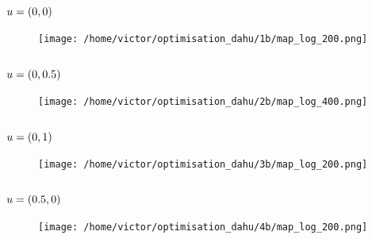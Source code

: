 \documentclass[../../Main_ManuscritThese.tex]{subfiles}
\begin{document}
\subsection*{$u=(0, 0)$}
\begin{figure}[ht]
  \centering
  \texttt{[image: /home/victor/optimisation\_dahu/1b/map\_log\_200.png]}
\end{figure}
\begin{figure}[ht]
  \centering
  \resizebox{1\textwidth}{!}{}
\end{figure}
\clearpage

\subsection*{$u=(0, 0.5)$}
\begin{figure}[ht]
  \centering
  \texttt{[image: /home/victor/optimisation\_dahu/2b/map\_log\_400.png]}
\end{figure}
\begin{figure}[ht]
  \centering
    \resizebox{1\textwidth}{!}{}
\end{figure}
\clearpage
\subsection*{$u=(0, 1)$}
\begin{figure}[ht]
  \centering
  \texttt{[image: /home/victor/optimisation\_dahu/3b/map\_log\_200.png]}
\end{figure}
\begin{figure}[ht]
  \centering
  \resizebox{1\textwidth}{!}{}
\end{figure}
\clearpage
\subsection*{$u=(0.5, 0)$}
\begin{figure}[ht]
  \centering
  \texttt{[image: /home/victor/optimisation\_dahu/4b/map\_log\_200.png]}
\end{figure}
\begin{figure}[ht]
  \centering
  \resizebox{1\textwidth}{!}{}
\end{figure}
\clearpage
\end{document}

